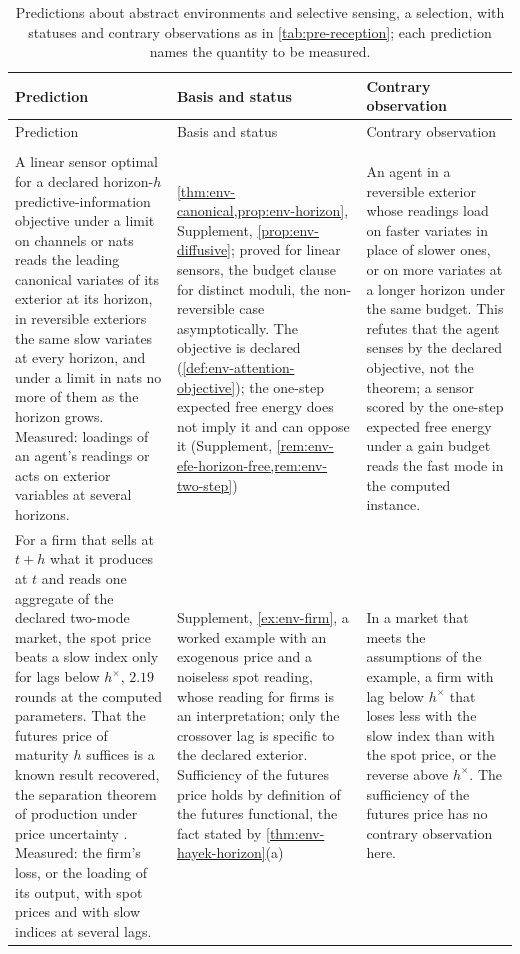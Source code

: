 \begingroup
\footnotesize
\setlength{\tabcolsep}{4pt}
\begin{longtable}{@{}>{\raggedright\arraybackslash}p{6.5cm}>{\raggedright\arraybackslash}p{3.9cm}>{\raggedright\arraybackslash}p{5.1cm}@{}}
\caption{Predictions about abstract environments and selective sensing, a selection, with statuses and contrary observations as in \cref{tab:pre-reception}; each prediction names the quantity to be measured.}\label{tab:pre-sensing}\\
\toprule
Prediction & Basis and status & Contrary observation\\
\midrule
\endfirsthead
\toprule
Prediction & Basis and status & Contrary observation\\
\midrule
\endhead
\bottomrule
\endfoot
\multicolumn{3}{@{}l}{\textit{Abstract environments and selective sensing, \cref{hyp:int-h5}(c)}}\\
A linear sensor optimal for a declared horizon-$h$ predictive-information objective under a limit on channels or nats reads the leading canonical variates of its exterior at its horizon, in reversible exteriors the same slow variates at every horizon, and under a limit in nats no more of them as the horizon grows. Measured: loadings of an agent's readings or acts on exterior variables at several horizons. & \cref{thm:env-canonical,prop:env-horizon}, Supplement, \cref{prop:env-diffusive}; proved for linear sensors, the budget clause for distinct moduli, the non-reversible case asymptotically. The objective is declared (\cref{def:env-attention-objective}); the one-step expected free energy does not imply it and can oppose it (Supplement, \cref{rem:env-efe-horizon-free,rem:env-two-step}) & An agent in a reversible exterior whose readings load on faster variates in place of slower ones, or on more variates at a longer horizon under the same budget. This refutes that the agent senses by the declared objective, not the theorem; a sensor scored by the one-step expected free energy under a gain budget reads the fast mode in the computed instance.\\
\addlinespace
For a firm that sells at $t+h$ what it produces at $t$ and reads one aggregate of the declared two-mode market, the spot price beats a slow index only for lags below $h^\times$, $2.19$ rounds at the computed parameters. That the futures price of maturity $h$ suffices is a known result recovered, the separation theorem of production under price uncertainty \citep{feder1980futures}. Measured: the firm's loss, or the loading of its output, with spot prices and with slow indices at several lags. & Supplement, \cref{ex:env-firm}, a worked example with an exogenous price and a noiseless spot reading, whose reading for firms is an interpretation; only the crossover lag is specific to the declared exterior. Sufficiency of the futures price holds by definition of the futures functional, the fact stated by \cref{thm:env-hayek-horizon}(a) & In a market that meets the assumptions of the example, a firm with lag below $h^\times$ that loses less with the slow index than with the spot price, or the reverse above $h^\times$. The sufficiency of the futures price has no contrary observation here.\\

\end{longtable}
